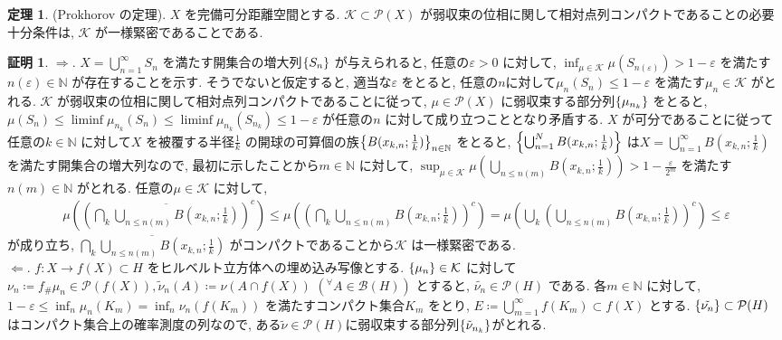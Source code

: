 \documentclass[10pt, fleqn, label-section=none, titlepage]{bxjsarticle}
\theoremstyle{definition}
\newtheorem{thm}[dfn]{定理}
\newtheorem*{pf*}{証明}
\newcommand{\any}{{}^{\forall}}
\newcommand{\veps}{\varepsilon}
\newcommand{\cbra}[1]{\mleft\{#1\mright\}}
\newcommand{\naraba}{\Rightarrow}
\newcommand{\gyaku}{\Leftarrow}
\newcommand{\push}{_{\#}}
\renewcommand{\;}{\, ; \,}
\begin{document}
\newpage

\begin{thm}
\label{1752}
(Prokhorov の定理).
$X$ を完備可分距離空間とする.
$\mathcal{K}\subset \mathcal{P}(X)$ が弱収束の位相に関して相対点列コンパクトであることの必要十分条件は, $\mathcal{K}$ が一様緊密であることである.  
\end{thm}
\begin{pf*}
$\naraba. $
$X = \bigcup_{n=1}^\infty S_n$ を満たす開集合の増大列$\cbra{S_n}$ が与えられると, 
任意の$\veps > 0$ に対して, $\inf_{\mu \in \mathcal{K}} \mu(S_{n(\veps)})> 1-\veps$ を満たす$n(\veps) \in \mathbb{N}$ が存在することを示す. 
そうでないと仮定すると, 適当な$\veps$ をとると,  任意の$n$に対して$\mu _n (S_n ) \leq 1 - \veps$ を満たす$\mu _n \in \mathcal{K}$ がとれる. $\mathcal{K}$ が弱収束の位相に関して相対点列コンパクトであることに従って, $\mu \in \mathcal{P}(X)$ に弱収束する部分列$\cbra{\mu_{n_k}}$ をとると, $\mu(S_n) \leq \liminf \mu_{n_k}(S_n) \leq \liminf \mu_{n_k}(S_{n_k}) \leq 1- \veps$ が任意の$n$ に対して成り立つこととなり矛盾する. $X$ が可分であることに従って任意の$k \in \mathbb{N}$ に対して$X$ を被覆する半径$\frac{1}{k}  $ の開球の可算個の族$\cbra{B(x_{k,n} ; \frac{1}{k})}_{n\in \mathbb{N}}$ をとると, $\cbra{\bigcup_{n=1}^N B(x_{k,n}; \frac{1}{k} ) }$ は$X = \bigcup_{n=1}^\infty B(x_{k,n}; \frac{1}{k} )$ を満たす開集合の増大列なので, 最初に示したことから$m \in \mathbb{N}$ に対して, $\sup_{\mu \in \mathcal{K}} \mu(\bigcup_{n\leq n(m)} B(x_{k,n}; \frac{1}{k} ) ) > 1 - \frac{\veps}{2^m} $ を満たす$n(m)\in \mathbb{N}$ がとれる. 任意の$\mu \in \mathcal{K}$ に対して, 
\begin{align*}
\mu((\overline{\bigcap_k \bigcup_{n\leq n(m)} B(x_{k,n}; \frac{1}{k} ) })^c ) 
\leq \mu((\bigcap_k \bigcup_{n\leq n(m)} B(x_{k,n}; \frac{1}{k} ) )^c ) 
= \mu( \bigcup_k (\bigcup_{n\leq n(m)} B(x_{k,n}; \frac{1}{k} ) )^c    )
\leq \veps
\end{align*}
が成り立ち, $\overline{\bigcap_k \bigcup_{n\leq n(m)} B(x_{k,n}; \frac{1}{k} ) }$ がコンパクトであることから$\mathcal{K}$ は一様緊密である. \\
$\gyaku.$ $f:X \rightarrow f(X) \subset H$ をヒルベルト立方体への埋め込み写像とする. $\cbra{\mu_n} \in \mathcal{K}$ に対して $\nu_n \coloneqq f\push \mu_n \in \mathcal{P}(f(X)), \tilde{\nu}_n (A) \coloneqq \nu(A \cap f(X)) \,\,(\any A \in \mathcal{B}(H) )$ とすると, $\tilde{\nu_n} \in \mathcal{P}(H)$ である. 各$m \in \mathbb{N}$ に対して, $1 - \veps \leq \inf_n \mu_n (K_m) = \inf_n \nu_n (f(K_m))$ を満たすコンパクト集合$K_m$ をとり, $E \coloneqq \bigcup_{m=1}^\infty f(K_m) \subset f(X)$ とする. $\cbra{\tilde{\nu_n}}\subset \mathcal{P}(H)$ はコンパクト集合上の確率測度の列なので, ある$\tilde{\nu} \in \mathcal{P}(H)$に弱収束する部分列$\cbra{\tilde{\nu}_{n_k}}$がとれる. 

\end{pf*}
\end{document}
